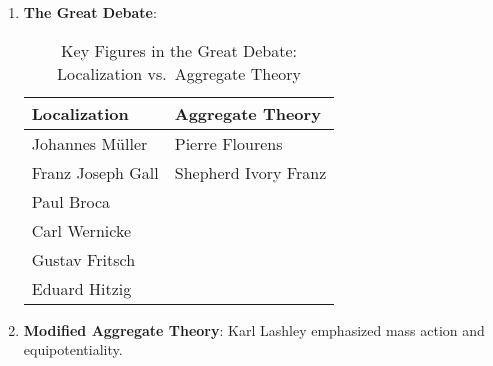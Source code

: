 \begin{enumerate}
    \item \textbf{The Great Debate}:
          \begin{table}[h]
              \centering
              \caption{Key Figures in the Great Debate: Localization vs.\ Aggregate Theory}
              \label{tab:great_debate}
              \begin{tabular}{@{}ll@{}}
                  \toprule
                  \textbf{Localization} & \textbf{Aggregate Theory} \\
                  \midrule
                  Johannes Müller       & Pierre Flourens           \\
                  Franz Joseph Gall     & Shepherd Ivory Franz      \\
                  Paul Broca            &                           \\
                  Carl Wernicke         &                           \\
                  Gustav Fritsch        &                           \\
                  Eduard Hitzig         &                           \\
                  \bottomrule
              \end{tabular}
          \end{table}

    \item \textbf{Modified Aggregate Theory}: Karl Lashley emphasized mass action and equipotentiality.
\end{enumerate}

